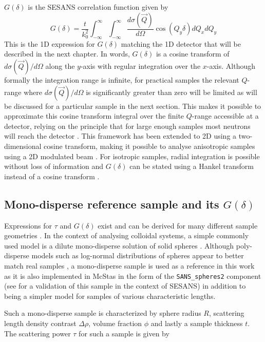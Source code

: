 \documentclass{article}
\begin{document}
$G(\delta)$ is the SESANS correlation function given by
\begin{equation}
	G(\delta) = \frac{t}{k_0^2}\int_{-\infty}^\infty\int_{-\infty}^\infty\dfrac{d\sigma(\vec{Q})}{d\Omega}\cos(Q_y \delta)dQ_xdQ_y  \label{eq:G-analytical}
\end{equation}
This is the 1D expression for $G(\delta)$ matching the 1D detector that will be described in the next chapter. In words, $G(\delta)$ is a cosine transform of $d\sigma(\vec{Q})/d\Omega$ \cite{li2019} along the $y$-axis with regular integration over the $x$-axis. Although formally the integration range is infinite, for practical samples the relevant $Q$-range where $d\sigma(\vec{Q})/d\Omega$ is significantly greater than zero will be limited as will be discussed for a particular sample in the next section. This makes it possible to approximate this cosine transform integral over the finite $Q$-range accessible at a detector, relying on the principle that for large enough samples most neutrons will reach the detector \cite{rekveldt1996}. This framework has been extended to 2D using a two-dimensional cosine transform, making it possible to analyse anisotropic samples using a 2D modulated beam \cite{parnell2023}.
For isotropic samples, radial integration is possible without loss of information and $G(\delta)$ can be stated using a Hankel transform instead of a cosine transform \cite{andersson2008}.

\subsection{Mono-disperse reference sample and its $G(\delta)$}
\label{c2.4}
Expressions for $\tau$ and $G(\delta)$ exist and can be derived for many different sample geometries \cite{andersson2008}. In the context of analysing colloidal systems, a simple commonly used model is a dilute mono-disperse solution of solid spheres \cite{tromp2007}. Although poly-disperse models such as log-normal distributions of spheres appear to better match real samples \cite{heijkamp2011}, a mono-disperse sample is used as a reference in this work as it is also implemented in McStas in the form of the \texttt{SANS\_spheres2} component (see \cite{parnell2024} for a validation of this sample in the context of SESANS) in addition to being a simpler model for samples of various characteristic lengths. 

Such a mono-disperse sample is characterized by sphere radius $R$, scattering length density contrast $\Delta\rho$, volume fraction $\phi$ and lastly a sample thickness $t$. The scattering power $\tau$ for such a sample is given by
\end{document}
